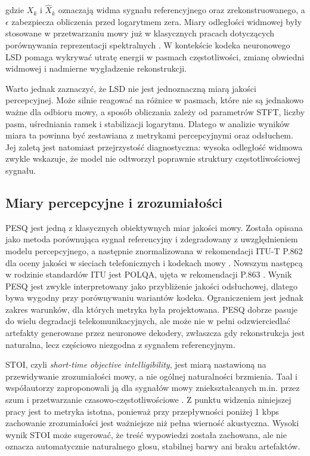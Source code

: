 gdzie \(X_k\) i \(\hat{X}_k\) oznaczają widma sygnału referencyjnego oraz zrekonstruowanego, a \(\epsilon\) zabezpiecza obliczenia przed logarytmem zera. Miary odległości widmowej były stosowane w przetwarzaniu mowy już w klasycznych pracach dotyczących porównywania reprezentacji spektralnych \cite{GrayMarkel1976DistanceMeasures}. W kontekście kodeka neuronowego LSD pomaga wykrywać utratę energii w pasmach częstotliwości, zmianę obwiedni widmowej i nadmierne wygładzenie rekonstrukcji.

Warto jednak zaznaczyć, że LSD nie jest jednoznaczną miarą jakości percepcyjnej. Może silnie reagować na różnice w pasmach, które nie są jednakowo ważne dla odbioru mowy, a sposób obliczania zależy od parametrów STFT, liczby pasm, uśredniania ramek i stabilizacji logarytmu. Dlatego w analizie wyników miara ta powinna być zestawiana z metrykami percepcyjnymi oraz odsłuchem. Jej zaletą jest natomiast przejrzystość diagnostyczna: wysoka odległość widmowa zwykle wskazuje, że model nie odtworzył poprawnie struktury częstotliwościowej sygnału.

\subsection{Miary percepcyjne i zrozumiałości}
\label{subsec:metryki-percepcyjne-zrozumialosc}

PESQ jest jedną z klasycznych obiektywnych miar jakości mowy. Została opisana jako metoda porównująca sygnał referencyjny i zdegradowany z uwzględnieniem modelu percepcyjnego, a następnie znormalizowana w rekomendacji ITU-T P.862 dla oceny jakości w sieciach telefonicznych i kodekach mowy \cite{Rix2001PESQ,ITUT2001P862}. Nowszym następcą w rodzinie standardów ITU jest POLQA, ujęta w rekomendacji P.863 \cite{ITUT2018P863}. Wynik PESQ jest zwykle interpretowany jako przybliżenie jakości odsłuchowej, dlatego bywa wygodny przy porównywaniu wariantów kodeka. Ograniczeniem jest jednak zakres warunków, dla których metryka była projektowana. PESQ dobrze pasuje do wielu degradacji telekomunikacyjnych, ale może nie w pełni odzwierciedlać artefakty generowane przez neuronowe dekodery, zwłaszcza gdy rekonstrukcja jest naturalna, lecz częściowo niezgodna z sygnałem referencyjnym.

STOI, czyli \emph{short-time objective intelligibility}, jest miarą nastawioną na przewidywanie zrozumiałości mowy, a nie ogólnej naturalności brzmienia. Taal i współautorzy zaproponowali ją dla sygnałów mowy zniekształcanych m.in. przez szum i przetwarzanie czasowo-częstotliwościowe \cite{Taal2011STOI}. Z punktu widzenia niniejszej pracy jest to metryka istotna, ponieważ przy przepływności poniżej 1 kbps zachowanie zrozumiałości jest ważniejsze niż pełna wierność akustyczna. Wysoki wynik STOI może sugerować, że treść wypowiedzi została zachowana, ale nie oznacza automatycznie naturalnego głosu, stabilnej barwy ani braku artefaktów.

